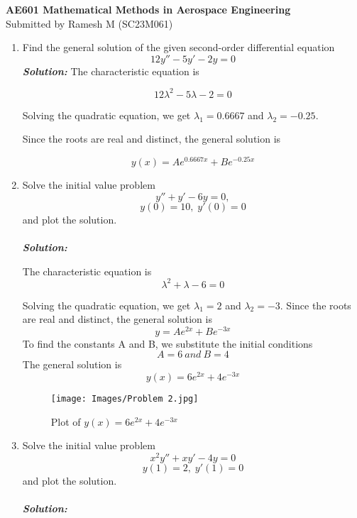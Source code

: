 \documentclass[]{book}
\theoremstyle{definition}
\begin{document}
\begin{center}
{\textbf{\Large AE601 Mathematical Methods in Aerospace Engineering}}\\

\normalsize{Submitted by Ramesh M (SC23M061)}\\
\end{center}

\vspace{0.2 cm}

\begin{enumerate}
\item
Find the  general solution of the given second-order differential equation
\[
12y'' - 5y' - 2y = 0
\]
\emph{\textbf{Solution:}}
The characteristic equation is

\[12\lambda^2 - 5\lambda - 2 = 0\]

Solving the quadratic equation, we get \(\lambda_1 = 0.6667\) and \(\lambda_2 = -0.25\).

Since the roots are real and distinct, the general solution is

\[{y}(x) = Ae^{0.6667x} + Be^{-0.25x}\]

\item 
Solve the initial value problem
\[y'' + y' - 6y = 0,\]
\[
y(0) = 10,\;y'(0) = 0
\]
and plot the solution.\\
\\
\emph{\textbf{Solution:}}

The characteristic equation is
\[
\lambda^2 + \lambda - 6 = 0
\]

Solving the quadratic equation, we get \(\lambda_1 = 2\) and \(\lambda_2 = -3\).
Since the roots are real and distinct, the general solution is
\[
y = Ae^{2x} + Be^{-3x}
\]
To find the constants A and B, we substitute the initial conditions
\[
A = 6\:and\:B = 4
\]
The general solution is
\[{y}(x) = 6e^{2x} + 4e^{-3x}\]
\begin{figure}[htbp]
    \centering
    \texttt{[image: Images/Problem 2.jpg]}
    \caption{Plot of $y(x) = 6e^{2x} + 4e^{-3x}$}
\end{figure}
\pagebreak

\item 
Solve the initial value problem
\[x^{2}{y}'' + x{y}' - 4y = 0\]
\[
y(1) = 2, \; {y}'(1) = 0
\]
and plot the solution.\\
\\
\emph{\textbf{Solution:}}


\end{enumerate}
\end{document}
